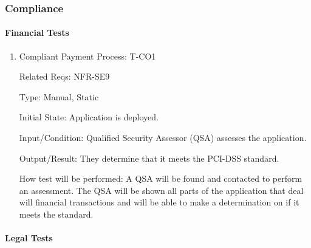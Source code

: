 \documentclass[12pt, titlepage]{article}
\begin{document}
\subsubsection{Compliance}

\paragraph{Financial Tests}

\begin{enumerate}

\item{Compliant Payment Process: T-CO1\\}

Related Reqs: NFR-SE9

Type: Manual, Static
					
Initial State: Application is deployed.
					
Input/Condition: Qualified Security Assessor (QSA) assesses the application.
					
Output/Result: They determine that it meets the PCI-DSS standard.
					
How test will be performed: A QSA will be found and contacted to perform an assessment. The QSA will be shown all parts of the application that deal will financial transactions and will be able to make a determination on if it meets the standard.
\end{enumerate}
		
\paragraph{Legal Tests}
\end{document}
